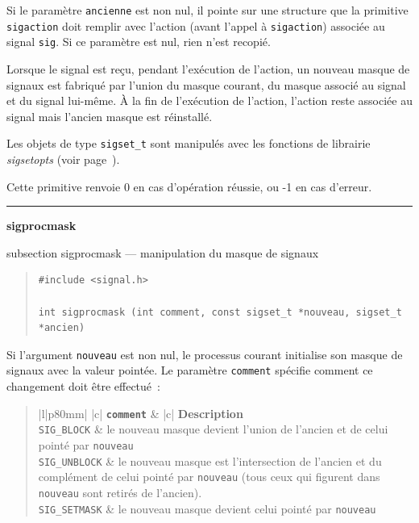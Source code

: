 \documentclass [twoside] {report}
\newcommand {\primitive} [1]
    {
	\phantomsection
	{\large \textbf {#1}}
	\addcontentsline {toc} {subsection} {#1}
    }
\newcommand {\separation}
    {
	\vspace {5mm}
	\nopagebreak
	\hrule
    }
\begin{document}
Si le paramètre \texttt {ancienne} est non nul, il pointe sur une structure
que la primitive \texttt {sigaction} doit remplir avec l'action (avant
l'appel à \texttt {sigaction}) associée au signal \texttt {sig}.  Si ce
paramètre est nul, rien n'est recopié.

Lorsque le signal est reçu, pendant l'exécution de l'action, un nouveau
masque de signaux est fabriqué par l'union du masque courant, du masque
associé au signal et du signal lui-même. \`A la fin de l'exécution de
l'action, l'action reste associée au signal mais l'ancien masque est
réinstallé.

Les objets de type \texttt {sigset\_t} sont manipulés avec les fonctions de
librairie \emph {sigsetopts} (voir page~\pageref {sigsetopts}).

Cette primitive renvoie 0 en cas d'opération réussie, ou -1 en cas
d'erreur.



\separation
\primitive {sigprocmask} --- manipulation du masque de signaux
    \label {sigprocmask}

\begin {quote}
\begin {verbatim}
#include <signal.h>

int sigprocmask (int comment, const sigset_t *nouveau, sigset_t *ancien)
\end{verbatim}
\end {quote}

Si l'argument \texttt {nouveau} est non nul, le processus courant initialise
son masque de signaux avec la valeur pointée. Le paramètre \texttt {comment}
spécifie comment ce changement doit être effectué~:

\begin {quote}
\begin {tabular} {|l|p{80mm}|} \hline
     {|c|} {\texttt {\textbf {comment}}}
	&  {|c|} {\textbf {Description}}
	\\ \hline
    \verb:SIG_BLOCK:
	& le nouveau masque devient l'union de l'ancien et de celui pointé
	    par \texttt {nouveau}
	\\ \hline
    \verb:SIG_UNBLOCK:
	& le nouveau masque est l'intersection de l'ancien et du
	    complément de celui pointé par \texttt {nouveau} (tous ceux qui
	    figurent dans \texttt {nouveau} sont retirés de l'ancien).
	\\ \hline
    \verb:SIG_SETMASK:
	& le nouveau masque devient celui pointé par \texttt {nouveau}
	\\ \hline
\end {tabular}
\end {quote}
\end{document}
